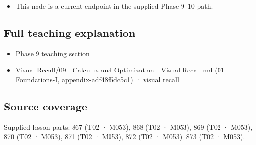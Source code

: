 \begin{itemize}
\tightlist
\item
  This node is a current endpoint in the supplied Phase 9--10 path.
\end{itemize}

\subsection{Full teaching explanation}\label{full-teaching-explanation}

\begin{itemize}
\tightlist
\item
  \href{Continuous\%20Notes/Computing\%20Foundations\%20-\%20From\%20Bits\%20to\%20C++\%20and\%20Systems\%20APIs\#Optimization\%20and\%20inverse\%20problems}{Phase 9 teaching section}
\item
  \href{}{Visual Recall/09 - Calculus and Optimization - Visual Recall.md (01-Foundations-I, appendix-adf48f5dc5c1)} · visual recall
\end{itemize}

\subsection{Source coverage}\label{source-coverage}

Supplied lesson parts: 867 (T02 · M053), 868 (T02 · M053), 869 (T02 · M053), 870 (T02 · M053), 871 (T02 · M053), 872 (T02 · M053), 873 (T02 · M053).
